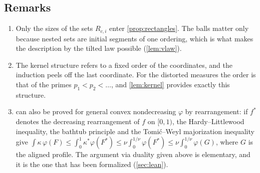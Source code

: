\subsection{Remarks}\label{sec:comparison-remarks}

\begin{enumerate}[label=(\arabic*)]
\item Only the sizes of the sets $R_{c,i}$ enter \cref{prop:rectangles}. The balls matter only because nested sets
  are initial segments of one ordering, which is what makes the description by the tilted law possible
  (\cref{lem:vlaw}).
\item The kernel structure refers to a fixed order of the coordinates, and the induction peels off the last
  coordinate. For the distorted measures the order is that of the primes $p_1<p_2<\dots$, and
  \cref{lem:kernel} provides exactly this structure.
\item {} can also be proved for general convex nondecreasing $\varphi$ by rearrangement: if
  $f^*$ denotes the decreasing rearrangement of $f$ on $[0,1)$, the Hardy--Littlewood inequality, the bathtub
  principle and the Tomi\'c--Weyl majorization inequality give
  $\int\kappa\,\varphi(F)\le\int_0^1\kappa^*\varphi(F^*)\le\nu\int_0^{1/\nu}\varphi(F^*)\le\nu\int_0^{1/\nu}\varphi(G)$,
  where $G$ is the aligned profile. The argument via duality given above is elementary, and it is the one that
  has been formalized (\cref{sec:lean}).
\end{enumerate}
